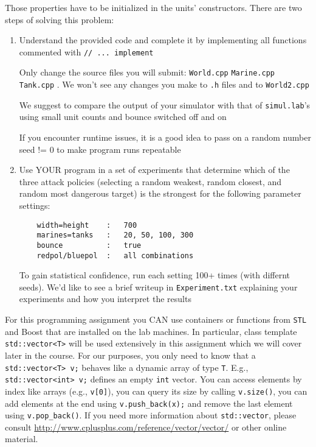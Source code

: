 \documentclass[a4paper,11pt]{article}
\begin{document}
Those properties have to be initialized in the units' constructors.
There are two steps of solving this problem:
\begin{enumerate}
    \item 
    Understand the provided code and complete it by implementing all functions
    commented with \texttt{// ... implement} 

    \medskip
 
    Only change the source files you will submit: \texttt{World.cpp} \texttt{Marine.cpp} \texttt{Tank.cpp} .
    We won't see any changes you make to \texttt{.h} files and to \texttt{World2.cpp}

    \medskip
 
    We suggest to compare the output of your simulator with that of \texttt{simul.lab}'s
    using small unit counts and bounce switched off and on

    \medskip
 
    If you encounter runtime issues, it is a good idea to pass on a random
    number seed != 0 to make program runs repeatable

    \medskip

    \item 
    Use YOUR program in a set of experiments that determine which of the three
    attack policies (selecting a random weakest, random closest, and random
    most dangerous target) is the strongest for the following parameter
    settings:
 
\begin{verbatim}
    width=height    :   700
    marines=tanks   :   20, 50, 100, 300
    bounce          :   true
    redpol/bluepol  :   all combinations
\end{verbatim}
 
    To gain statistical confidence, run each setting 100+ times (with differnt
    seeds). We'd like to see a brief writeup in \texttt{Experiment.txt} explaining your
    experiments and how you interpret the results
\end{enumerate}

For this programming assignment you CAN use {\CC} containers or functions from
\texttt{STL} and Boost that are installed on the lab machines. In particular, class
template \texttt{std::vector<T>} will be used extensively in this assignment which we
will cover later in the course. For our purposes, you only need to know that a
\texttt{std::vector<T> v;} behaves like a dynamic array of type \texttt{T}. E.g., \texttt{std::vector<int> v;}
defines an empty \texttt{int} vector. You can access elements by index like arrays
(e.g., \texttt{v[0]}), you can query its size by calling \texttt{v.size()}, you can add elements
at the end using \texttt{v.push\_back(x);} and remove the last element using
\texttt{v.pop\_back()}. If you need more information about \texttt{std::vector}, please consult
\url{http://www.cplusplus.com/reference/vector/vector/} or other online material.
\end{document}
